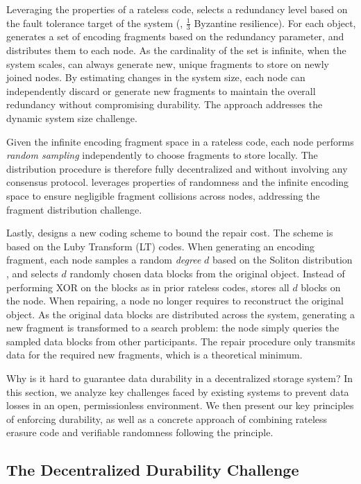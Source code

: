 Leveraging the properties of a rateless code, \sys selects a redundancy level based on the fault tolerance target of the system (\eg, $\frac{1}{3}$ Byzantine resilience).
For each object, \sys generates a set of encoding fragments based on the redundancy parameter, and distributes them to each node.
As the cardinality of the set is infinite, when the system scales, \sys can always generate new, unique fragments to store on newly joined nodes.
By estimating changes in the system size, each node can independently discard or generate new fragments to maintain the overall redundancy without compromising durability.
The approach addresses the dynamic system size challenge.

Given the infinite encoding fragment space in a rateless code, each \sys node performs \emph{random sampling} independently to choose fragments to store locally.
The distribution procedure is therefore fully decentralized and without involving any consensus protocol.
\sys leverages properties of randomness and the infinite encoding space to ensure negligible fragment collisions across nodes, addressing the fragment distribution challenge.

Lastly, \sys designs a new coding scheme to bound the repair cost.
The scheme is based on the Luby Transform (LT) codes.
When generating an encoding fragment, each node samples a random \emph{degree} $d$ based on the Soliton distribution , and selects $d$ randomly chosen data blocks from the original object.
Instead of performing XOR on the blocks as in prior rateless codes, \sys stores all $d$ blocks on the node.
When repairing, a node no longer requires to reconstruct the original object.
As the original data blocks are distributed across the system, generating a new fragment is transformed to a search problem:
the node simply queries the sampled data blocks from other participants.
The repair procedure only transmits data for the required new fragments, which is a theoretical minimum.


\iffalse
Why is it hard to guarantee data durability in a decentralized storage system?
In this section, we analyze key challenges faced by existing systems to prevent data losses in an open, permissionless environment.
We then present our key principles of enforcing durability, as well as a concrete approach of combining rateless erasure code and verifiable randomness following the principle.

\subsection{The Decentralized Durability Challenge}
\label{sec:approach:challenge}

